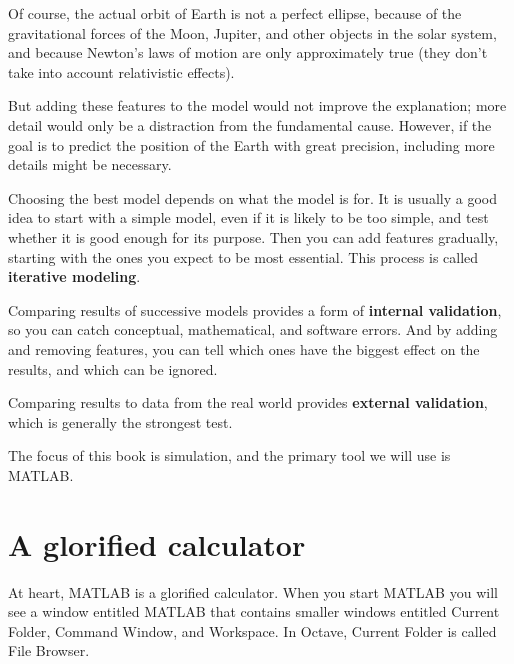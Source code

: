 \documentclass[
]{book}
\numberwithin{Answer}{chapter}
\numberwithin{Exercise}{chapter}
\begin{document}
Of course, the actual orbit of Earth is not a perfect ellipse, because of the gravitational forces of the Moon, Jupiter, and other objects in the solar system, and because Newton's laws of motion are only approximately true (they don't take into account relativistic effects).


But adding these features to the model would not improve the explanation; more detail would only be a distraction from the fundamental cause.  However, if the goal is to predict the position of the Earth with great precision, including more details might be necessary.  

Choosing the best model depends on what the model is for.  It is usually a good idea to start with a simple model, even if it is likely to be too simple, and test whether it is good enough for its purpose.  Then you can add features gradually, starting with the ones you expect to be most essential.  This process is called {\bf iterative modeling}.


Comparing results of successive models provides a form of {\bf internal validation}, so you can catch conceptual, mathematical, and software errors.  And by adding and removing features, you can tell which ones have the biggest effect on the results, and which can be ignored.


Comparing results to data from the real world provides {\bf external validation}, which is generally the strongest test.

The focus of this book is simulation, and the primary tool we will use is MATLAB.


\section{A glorified calculator}
\label{sect:calc}

At heart, MATLAB is a glorified calculator.  When you start MATLAB
you will see a window
entitled {\sf MATLAB} that contains smaller windows entitled {\sf
Current Folder}, {\sf Command Window}, and {\sf Workspace}.
In Octave, {\sf Current Folder} is called {\sf File Browser}.

\end{document}
